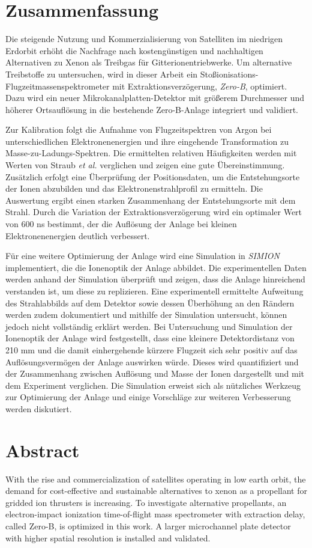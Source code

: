 \chapter*{Zusammenfassung}
Die steigende Nutzung und Kommerzialisierung von Satelliten im niedrigen Erdorbit erhöht die Nachfrage nach kostengünstigen und nachhaltigen Alternativen zu Xenon als Treibgas für Gitterionentriebwerke. Um alternative Treibstoffe zu untersuchen, wird in dieser Arbeit ein Stoßionisations-Flugzeitmassenspektrometer mit Extraktionsverzögerung, \textit{Zero-B}, optimiert. Dazu wird ein neuer Mikrokanalplatten-Detektor mit größerem Durchmesser und höherer Ortsauflösung in die bestehende Zero-B-Anlage integriert und validiert. 

Zur Kalibration folgt die Aufnahme von Flugzeitspektren von Argon bei unterschiedlichen Elektronenenergien und ihre eingehende Transformation zu Masse-zu-Ladungs-Spektren. Die ermittelten relativen Häufigkeiten werden mit Werten von Straub \textit{et al.} \cite{Straub} verglichen und zeigen eine gute Übereinstimmung. Zusätzlich erfolgt eine Überprüfung der Positionsdaten, um die Entstehungsorte der Ionen abzubilden und das Elektronenstrahlprofil zu ermitteln. Die Auswertung ergibt einen starken Zusammenhang der Entstehungsorte mit dem Strahl. Durch die Variation der Extraktionsverzögerung wird ein optimaler Wert von 600 ns bestimmt, der die Auflösung der Anlage bei kleinen Elektronenenergien deutlich verbessert.

Für eine weitere Optimierung der Anlage wird eine Simulation in \textit{SIMION} implementiert, die die Ionenoptik der Anlage abbildet. Die experimentellen Daten werden anhand der Simulation überprüft und zeigen, dass die Anlage hinreichend verstanden ist, um diese zu replizieren. Eine experimentell ermittelte Aufweitung des Strahlabbilds auf dem Detektor sowie dessen Überhöhung an den Rändern werden zudem dokumentiert und mithilfe der Simulation untersucht, können jedoch nicht vollständig erklärt werden. Bei Untersuchung und Simulation der Ionenoptik der Anlage wird festgestellt, dass eine kleinere Detektordistanz von 210 mm und die damit einhergehende kürzere Flugzeit sich sehr positiv auf das Auflösungsvermögen der Anlage auswirken würde. Dieses wird quantifiziert und der Zusammenhang zwischen Auflösung und Masse der Ionen dargestellt und mit dem Experiment verglichen. Die Simulation erweist sich als nützliches Werkzeug zur Optimierung der Anlage und einige Vorschläge zur weiteren Verbesserung werden diskutiert.

\chapter*{Abstract}
With the rise and commercialization of satellites operating in low earth orbit, the demand for cost-effective and sustainable alternatives to xenon as a propellant for gridded ion thrusters is increasing. To investigate alternative propellants, an electron-impact ionization time-of-flight mass spectrometer with extraction delay, called Zero-B, is optimized in this work. A larger microchannel plate detector with higher spatial resolution is installed and validated.

